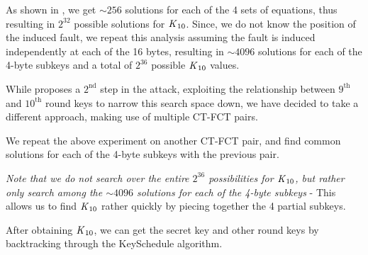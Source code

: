 \documentclass[12pt,a4paper,english]{paper}
\begin{document}

As shown in \cite{10.1007/978-3-642-21040-2_15}, we get $\sim256$ solutions for each of the 4 sets of equations, thus resulting in $2^{32}$ possible solutions for $\text{\textit{K}}_{10}$. Since, we do not know the position of the induced fault, we repeat this analysis assuming the fault is induced independently at each of the 16 bytes, resulting in $\sim4096$ solutions for each of the 4-byte subkeys and a total of $2^{36}$ possible $\text{\textit{K}}_{10}$ values.

While \cite{10.1007/978-3-642-21040-2_15} proposes a $2^{\text{nd}}$ step in the attack, exploiting the relationship between $9^{\text{th}}$ and $10^{\text{th}}$ round keys to narrow this search space down, we have decided to take a different approach, making use of multiple CT-FCT pairs.

We repeat the above experiment on another CT-FCT pair, and find common solutions for each of the 4-byte subkeys with the previous pair.

\textit{Note that we do not search over the entire $2^{36}$ possibilities for $\text{\textit{K}}_{10}$, but rather only search among the $\sim4096$ solutions for each of the 4-byte subkeys} - This allows us to find $\text{\textit{K}}_{10}$ rather quickly by piecing together the 4 partial subkeys.

After obtaining $\text{\textit{K}}_{10}$, we can get the secret key and other round keys by backtracking through the {\selectfont KeySchedule} algorithm.
\end{document}
